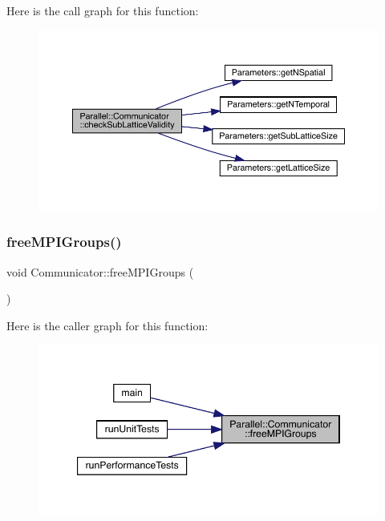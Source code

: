 Here is the call graph for this function\+:
\nopagebreak
\begin{figure}[H]
\begin{center}
\leavevmode
\includegraphics[width=350pt]{class_parallel_1_1_communicator_a5da7239eefebcebbeeabee499b2d724d_cgraph}
\end{center}
\end{figure}
\mbox{\label{class_parallel_1_1_communicator_aca0ac979aee1a649dbe5d4582b06a707}} 
\subsubsection{\texorpdfstring{freeMPIGroups()}{freeMPIGroups()}}
{\footnotesize\ttfamily void Communicator\+::free\+M\+P\+I\+Groups (\begin{DoxyParamCaption}{ }\end{DoxyParamCaption})\hspace{0.3cm}{\ttfamily [static]}}

Here is the caller graph for this function\+:
\nopagebreak
\begin{figure}[H]
\begin{center}
\leavevmode
\includegraphics[width=347pt]{class_parallel_1_1_communicator_aca0ac979aee1a649dbe5d4582b06a707_icgraph}
\end{center}
\end{figure}
\mbox{\label{class_parallel_1_1_communicator_ae5739683ff54a7c39af6e37920e70ea5}} 
